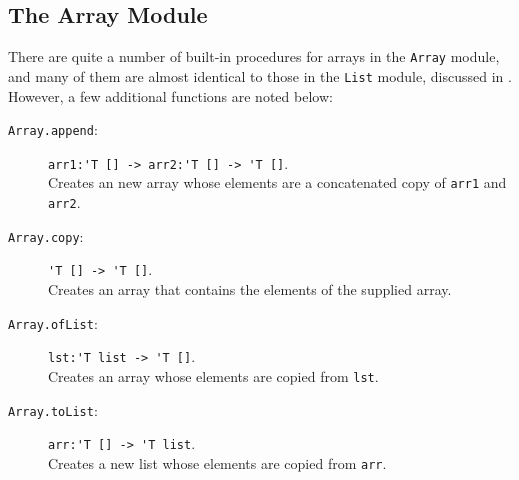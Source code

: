 \documentclass[fsharpNotes.tex]{subfiles}
\begin{document}
\subsection{The Array Module}
\label{sec:arrayModule}
There are quite a number of built-in procedures for arrays in the \lstinline{Array} module, and many of them are almost identical to those in the \lstinline{List} module, discussed in . However, a few additional functions are noted below:
\begin{description}
\item[\texttt{Array.append}:] \lstinline{arr1:'T [] -> arr2:'T [] -> 'T []}.~\\
  Creates an new array whose elements are a concatenated copy of \lstinline{arr1} and \lstinline{arr2}.
\item[\texttt{Array.copy}:] \lstinline{'T [] -> 'T []}.~\\
  Creates an array that contains the elements of the supplied array.
\item[\texttt{Array.ofList}:] \lstinline{lst:'T list -> 'T []}.~\\
  Creates an array whose elements are copied from \lstinline{lst}.
\item[\texttt{Array.toList}:] \lstinline{arr:'T [] -> 'T list}.~\\
  Creates a new list whose elements are copied from \lstinline{arr}.
\end{description}
\end{document}
